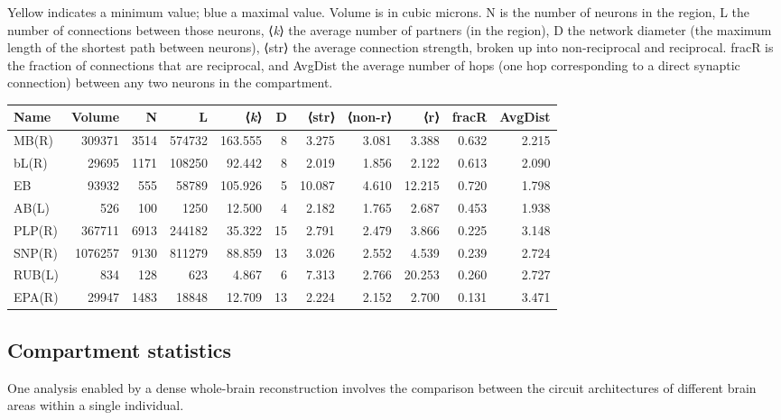 \documentclass{article}
\newcommand{\hlmin}[1]{\colorbox{yellow!50}{#1}}
\newcommand{\hlmax}[1]{\colorbox{cyan!30}{#1}}
\begin{document}
\noindent Yellow indicates a minimum value; blue a maximal value. Volume is in cubic microns. N is the number of neurons in the region, L the number of connections between those neurons, ⟨\emph{k}⟩ the average number of partners (in the region), D the network diameter (the maximum length of the shortest path between neurons), ⟨str⟩ the average connection strength, broken up into non-reciprocal and reciprocal. fracR is the fraction of connections that are reciprocal, and AvgDist the average number of hops (one hop corresponding to a direct synaptic connection) between any two neurons in the compartment.
\begin{center}\footnotesize
\begin{longtable}{lrrrrrrrrrr}
\textbf{Name} & \textbf{Volume} & \textbf{N} & \textbf{L} & ⟨\emph{k}⟩ & \textbf{D} & ⟨str⟩ & ⟨non-r⟩ & ⟨r⟩ & \textbf{fracR} & \textbf{AvgDist} \\
\hline
MB(R) & 309371 & 3514 & 574732 & \hlmax{163.555} & 8 & 3.275 & 3.081 & 3.388 & 0.632 & 2.215 \\
bL(R) & 29695 & 1171 & 108250 & 92.442 & 8 & \hlmin{2.019} & 1.856 & 2.122 & 0.613 & 2.090 \\
EB & 93932 & 555 & 58789 & 105.926 & 5 & \hlmax{10.087} & 4.610 & 12.215 & \hlmax{0.720} & \hlmin{1.798} \\
AB(L) & 526 & \hlmin{100} & 1250 & 12.500 & \hlmin{4} & 2.182 & 1.765 & 2.687 & 0.453 & 1.938 \\
PLP(R) & 367711 & 6913 & 244182 & 35.322 & \hlmax{15} & 2.791 & 2.479 & 3.866 & 0.225 & 3.148 \\
SNP(R) & 1076257 & \hlmax{9130} & 811279 & 88.859 & 13 & 3.026 & 2.552 & 4.539 & 0.239 & 2.724 \\
RUB(L) & 834 & 128 & 623 & \hlmin{4.867} & 6 & 7.313 & 2.766 & 20.253 & 0.260 & 2.727 \\
EPA(R) & 29947 & 1483 & 18848 & 12.709 & 13 & 2.224 & 2.152 & 2.700 & \hlmin{0.131} & \hlmax{3.471} \\
\end{longtable}
\end{center}

\subsection*{Compartment statistics}

One analysis enabled by a dense whole-brain reconstruction involves the comparison between the circuit architectures of different brain areas within a single individual.
\end{document}
